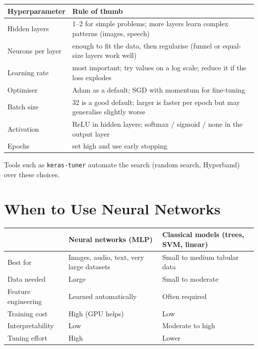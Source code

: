 \begin{center}
\begin{tabular}{@{}p{3.6cm}p{10cm}@{}}
\toprule
\textbf{Hyperparameter} & \textbf{Rule of thumb}\\
\midrule
Hidden layers & 1--2 for simple problems; more layers learn complex patterns (images, speech)\\
Neurons per layer & enough to fit the data, then regularise (funnel or equal-size layers work well)\\
Learning rate & most important; try values on a log scale; reduce it if the loss explodes\\
Optimiser & Adam as a default; SGD with momentum for fine-tuning\\
Batch size & 32 is a good default; larger is faster per epoch but may generalise slightly worse\\
Activation & ReLU in hidden layers; softmax / sigmoid / none in the output layer\\
Epochs & set high and use early stopping\\
\bottomrule
\end{tabular}
\end{center}

\noindent Tools such as \texttt{keras-tuner} automate the search (random search, Hyperband) over these choices.

\section{When to Use Neural Networks}

\begin{center}
\small
\begin{tabular}{@{}p{3.2cm}p{4.9cm}p{5.2cm}@{}}
\toprule
 & \textbf{Neural networks (MLP)} & \textbf{Classical models (trees, SVM, linear)}\\
\midrule
Best for & Images, audio, text, very large datasets & Small to medium tabular data\\
Data needed & Large & Small to moderate\\
Feature engineering & Learned automatically & Often required\\
Training cost & High (GPU helps) & Low\\
Interpretability & Low & Moderate to high\\
Tuning effort & High & Lower\\
\bottomrule
\end{tabular}
\end{center}


